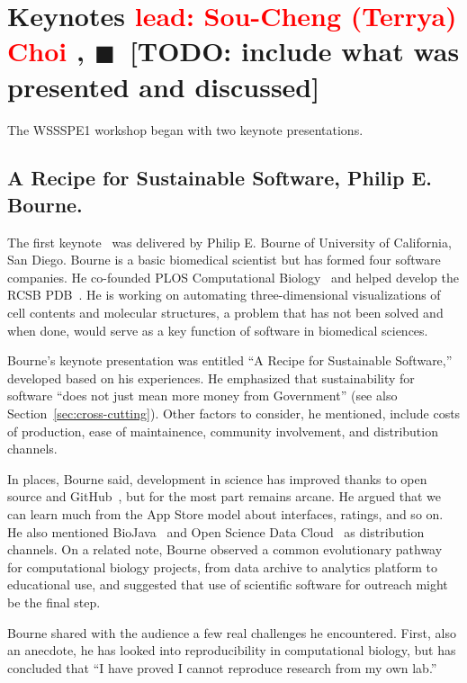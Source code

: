 \documentclass[11pt, oneside]{amsart}
\newcommand{\todo}[1]{{\color{blue}$\blacksquare$~\textsf{[TODO: #1]}}}
\newcommand{\note}[1]{ {\textcolor{red}    { #1 }}}
\begin{document}
\section{Keynotes\scriptsize{\note{lead: Sou-Cheng (Terrya) Choi}, \todo{include what was presented and discussed}}} \label{sec:keynotes}

The WSSSPE1 workshop began with two keynote presentations.


\subsection{A Recipe for Sustainable Software, Philip E. Bourne.} \label{sec:keynote1}

The first keynote~\cite{WSSSPE1-keynote1} was delivered by Philip
E. Bourne of University of California, San Diego.  Bourne is a basic
biomedical scientist but has formed four software companies. He co-founded 
PLOS Computational Biology~\cite{plos-web} and helped develop the RCSB PDB~\cite{pdb-web}.  
He is working on automating three-dimensional visualizations of cell
contents and molecular structures, a problem that has not been solved
and when done, would serve as a key function of software in biomedical
sciences.

Bourne's keynote presentation was entitled ``A Recipe for Sustainable
Software,'' developed based on his experiences.  He emphasized that
sustainability for software ``does not just mean more money from
Government'' (see also Section~\ref{sec:cross-cutting}).  Other
factors to consider, he mentioned, include costs of production, ease
of maintainence, community involvement, and distribution channels.

In places, Bourne said, development in science has improved thanks to
open source and GitHub~\cite{github-web}, but for the most part
remains arcane. He argued that we can learn much from the App Store
model about interfaces, ratings, and so on. He also mentioned
BioJava~\cite{biojava-web} and Open Science Data Cloud~\cite{osdc-web}
as distribution channels.  On a related note, Bourne observed a common
evolutionary pathway for computational biology projects, from data
archive to analytics platform to educational use, and suggested that
use of scientific software for outreach might be the final step.

Bourne shared with the audience a few real challenges he
encountered. First, also an anecdote, he has looked into
reproducibility in computational biology, but has concluded that ``I
have proved I cannot reproduce research from my own
lab.''~\cite{Veretnik}
\end{document}
